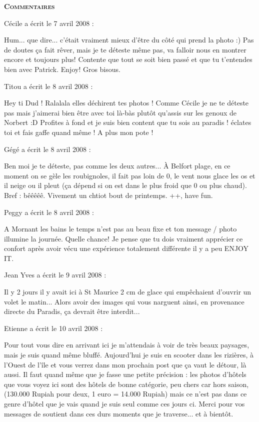 \bigskip
\textbf{\textsc{Commentaires}}

\medskip
Cécile a écrit le 7 avril 2008 :
\begin{displayquote}
Hum... que dire... c'était vraiment mieux d'être du côté qui prend la photo :) Pas de doutes ça fait rêver, mais je te déteste même pas, va falloir nous en montrer encore et toujours plus!
Contente que tout se soit bien passé et que tu t'entendes bien avec Patrick. Enjoy!
Gros bisous.
\end{displayquote}

\medskip
Titou a écrit le 8 avril 2008 :
\begin{displayquote}
Hey ti Dud !
Ralalala elles déchirent tes photos ! Comme Cécile je ne te déteste pas mais j'aimerai bien être avec toi là-bàs plutôt qu'assis sur les genoux de Norbert :D
Profites à fond et je suis bien content que tu sois au paradis ! éclates toi et fais gaffe quand même !
A plus mon pote !
\end{displayquote}

\medskip
Gégé a écrit le 8 avril 2008 :
\begin{displayquote}
Ben moi je te déteste, pas comme les deux autres...
À Belfort plage, en ce moment on se gèle les roubignoles, il fait pas loin de 0, le vent nous glace les os et il neige ou il pleut (ça dépend si on est dans le plus froid que 0 ou plus chaud). Bref : bêêêêê.
Vivement un chtiot bout de printemps.
++, have fun.
\end{displayquote}

\medskip
Peggy a écrit le 8 avril 2008 :
\begin{displayquote}
A Mornant les bains le temps n'est pas au beau fixe et ton message / photo illumine la journée.
Quelle chance!
Je pense que tu dois vraiment apprécier ce confort après avoir vécu une expérience totalement différente il y a peu
ENJOY IT.
\end{displayquote}

\medskip
Jean Yves a écrit le 9 avril 2008 :
\begin{displayquote}
Il y 2 jours il y avait ici à St Maurice 2 cm de glace qui empêchaient d'ouvrir un volet le matin... Alors avoir des images qui vous narguent ainsi, en provenance directe du Paradis, ça devrait être interdit...
\end{displayquote}

\medskip
Etienne a écrit le 10 avril 2008 :
\begin{displayquote}
Pour tout vous dire en arrivant ici je m'attendais à voir de très beaux paysages, mais je suis quand même bluffé.
Aujourd'hui je suis en scooter dans les rizières, à l'Ouest de l'île et vous verrez dans mon prochain post que ça vaut le détour, là aussi.
Il faut quand même que je fasse une petite précision : les photos d'hôtels que vous voyez ici sont des hôtels de bonne catégorie, peu chers car hors saison, (130.000 Rupiah pour deux, 1 euro = 14.000 Rupiah) mais ce n'est pas dans ce genre d'hôtel que je vais quand je suis seul comme ces jours ci.
Merci pour vos messages de soutient dans ces durs moments que je traverse... et à bientôt.
\end{displayquote}

